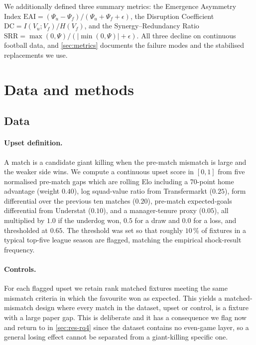\documentclass[11pt,a4paper]{article}
\begin{document}
We additionally defined three summary metrics: the Emergence Asymmetry Index
$\mathrm{EAI}=(\Psi_u-\Psi_f)/(\Psi_u+\Psi_f+\epsilon)$, the Disruption Coefficient
$\mathrm{DC}=I(V_u;V_f)/H(V_f)$, and the Synergy--Redundancy Ratio
$\mathrm{SRR}=\max(0,\Psi)/(|\min(0,\Psi)|+\epsilon)$. All three decline on continuous
football data, and \cref{sec:metrics} documents the failure modes and the stabilised
replacements we use.

\section{Data and methods}
\label{sec:methods}

\subsection{Data}
\label{sec:corpus}

\paragraph{Upset definition.} A match is a candidate giant killing when the pre-match
mismatch is large and the weaker side wins. We compute a continuous upset score in
$[0,1]$ from five normalised pre-match gaps which are rolling Elo including a 70-point home
advantage (weight $0.40$), log squad-value ratio from Transfermarkt ($0.25$), form
differential over the previous ten matches ($0.20$), pre-match expected-goals differential
from Understat ($0.10$), and a manager-tenure proxy ($0.05$), all multiplied by $1.0$ if
the underdog won, $0.5$ for a draw and $0.0$ for a loss, and thresholded at $0.65$. The
threshold was set so that roughly $10\,\%$ of fixtures in a typical top-five league season
are flagged, matching the empirical shock-result frequency.

\paragraph{Controls.} For each flagged upset we retain rank matched fixtures meeting the
same mismatch criteria in which the favourite won as expected. This yields a
matched-mismatch design where every match in the dataset, upset or control, is a
fixture with a large paper gap. This is deliberate and it has a consequence we flag now
and return to in \cref{sec:res-rq4} since the dataset contains no even-game layer, so a
general losing effect cannot be separated from a giant-killing specific one.
\end{document}
